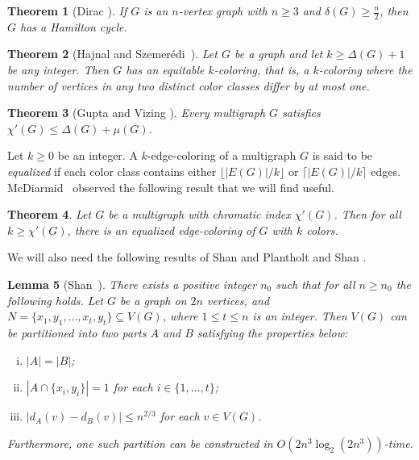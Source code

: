 \documentclass[11pt, oneside]{article}
\newtheorem{theorem}{Theorem}
\newtheorem{lemma}[theorem]{Lemma}
\begin{document}
\begin{theorem}[Dirac \cite{Dirac}]\label{thm:dirac} If $G$ is an $n$-vertex graph with $n\geq 3$ and $\delta(G)\geq \tfrac{n}{2}$, then $G$ has a Hamilton cycle. 
\end{theorem}

\begin{theorem}[Hajnal and Szemer\'edi~\cite{MR0297607}]\label{them:Hajnal–Szemeredi}
	Let $G$ be a graph and let $k\ge \Delta(G)+1$ be any integer. Then $G$ has an equitable $k$-coloring, that is, a $k$-coloring where the number of vertices in any two distinct color classes differ by at most one.
\end{theorem}

\begin{theorem}[Gupta \cite{Gupta-67} and Vizing \cite{Vizing-2-classes}]\label{thm:chromatic-index}
Every multigraph  $G$ satisfies $\chi'(G) \le \Delta(G)+\mu(G)$. 
\end{theorem}

Let $k\ge 0$ be an integer. A $k$-edge-coloring of a multigraph $G$ is said to be \emph{equalized} if each color class contains either $\lfloor |E(G)|/k \rfloor$ or $\lceil |E(G)|/k \rceil$ edges.  McDiarmid~\cite{MR300623} observed the following result that we will find useful. 
\begin{theorem}\label{lem:equa-edge-coloring}
	Let $G$ be a multigraph with chromatic index $\chi'(G)$. Then for all $k\ge \chi'(G)$, there is an equalized edge-coloring of $G$ with $k$ colors. 
\end{theorem}

We will also need the following results of Shan \cite{SHAN2022429} and Plantholt and Shan \cite{Plantholt-Shan}.

\begin{lemma}[Shan~{\cite[Lemma 3.2]{SHAN2022429}}]\label{lem:partition}
	There exists a positive integer $n_0$ such that for all $n\ge n_0$ the
	following holds. Let $G$ be a graph on $2n$ vertices, and $N=\{x_1,y_1,\ldots, x_t,y_t\}\subseteq V(G)$, where $ 1\le t\le n$ is an integer.  
	Then $V(G)$ can be partitioned into two  parts 
	$A$ and $B$ satisfying the properties below:
	\begin{enumerate}[(i)]
		\item  $|A|=|B|$;
		\item $|A\cap \{x_i,y_i\}|=1$ for each $i\in \{1,\ldots, t\}$;
		\item $| d_A(v)-d_B(v)| \le n^{2/3}$ for each $v\in V(G)$. 
	\end{enumerate}
	Furthermore, one such partition can be constructed in $O(2n^3 \log_2 (2n^3))$-time. 
\end{lemma}
\end{document}
